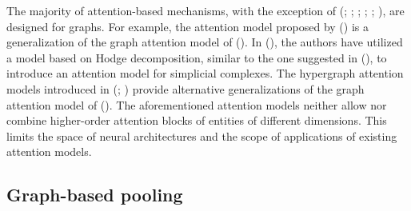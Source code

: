 \documentclass[
  12pt,
]{krantz}
\begin{document}
The majority of attention-based mechanisms, with the exception of
(;
;
; ; ; ), are designed for graphs. For example, the attention model
proposed by () is a generalization of the graph attention model of
(). In
(), the authors have utilized a model based on Hodge
decomposition, similar to the one suggested in
(), to introduce an attention model for
simplicial complexes. The hypergraph attention models introduced in
(;
) provide
alternative generalizations of the graph attention model of
(). The
aforementioned attention models neither allow nor combine higher-order
attention blocks of entities of different dimensions. This limits the
space of neural architectures and the scope of applications of existing
attention models.

\subsection{Graph-based pooling}\label{graph-based-pooling}
\end{document}
